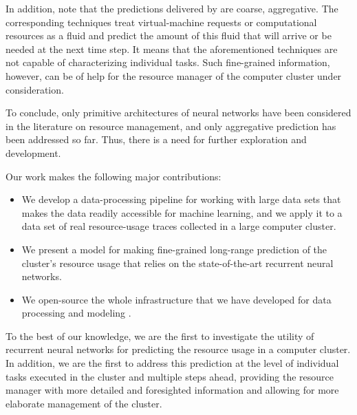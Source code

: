 In addition, note that the predictions delivered by \cite{dabbagh2015,
ismaeel2015, cao2014} are coarse, aggregative. The corresponding techniques
treat virtual-machine requests or computational resources as a fluid and predict
the amount of this fluid that will arrive or be needed at the next time step. It
means that the aforementioned techniques are not capable of characterizing
individual tasks. Such fine-grained information, however, can be of help for the
resource manager of the computer cluster under consideration.

To conclude, only primitive architectures of neural networks have been
considered in the literature on resource management, and only aggregative
prediction has been addressed so far. Thus, there is a need for further
exploration and development.

Our work makes the following major contributions:
\begin{itemize}
\item We develop a data-processing pipeline for working with large data sets
that makes the data readily accessible for machine learning, and we apply it to
a data set of real resource-usage traces collected in a large computer cluster.

\item We present a model for making fine-grained long-range prediction of the
cluster's resource usage that relies on the state-of-the-art recurrent neural
networks.

\item We open-source the whole infrastructure that we have developed for data
processing and modeling \cite{sources}.
\end{itemize}
To the best of our knowledge, we are the first to investigate the utility of
recurrent neural networks for predicting the resource usage in a computer
cluster. In addition, we are the first to address this prediction at the level
of individual tasks executed in the cluster and multiple steps ahead, providing
the resource manager with more detailed and foresighted information and allowing
for more elaborate management of the cluster.

